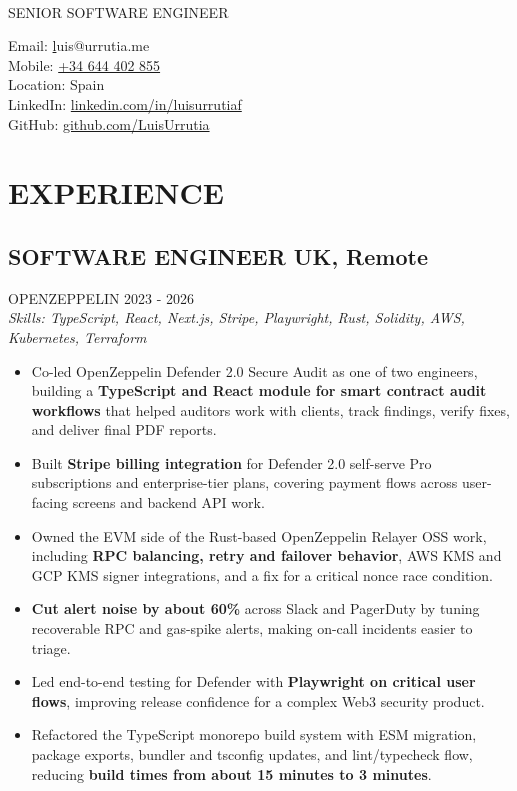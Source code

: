 \documentclass{article}
\newcommand{\WorkExperience}[2]{
   \subsection*{#1}
   \vspace{-1em}
   \uppercase{#2}
}
\newcommand{\Skills}[1]{
   \textit{Skills: #1}
}
\begin{document}
\begin{center}
	\begin{minipage}{0.5\textwidth}
		{\fontsize{24}{28}\Title{}} \\
		\bigskip
		{\normalsize \MakeUppercase{Senior Software Engineer}}
	\end{minipage} \hfill
	\begin{minipage}{0.4\textwidth}
		\raggedleft{}
		Email: \href{mailto:luis@urrutia.me}luis@urrutia.me \\
		Mobile: \href{tel:+34644402855}{+34 644 402 855}  \\
		Location: Spain \\
		LinkedIn: \href{https://linkedin.com/in/luisurrutiaf}{linkedin.com/in/luisurrutiaf} \\
		GitHub: \href{https://github.com/LuisUrrutia}{github.com/LuisUrrutia}
	\end{minipage}
\end{center}

\vspace{-3em}

\phantom{Amazon, Microsoft, Facebook} %

\section*{EXPERIENCE}
\WorkExperience{SOFTWARE ENGINEER \hfill UK, Remote}{OpenZeppelin \hfill 2023 {-} 2026} \\
\Skills{TypeScript, React, Next.js, Stripe, Playwright, Rust, Solidity, AWS, Kubernetes, Terraform}
\begin{itemize}
	\item Co-led OpenZeppelin Defender 2.0 Secure Audit as one of two engineers, building a \textbf{TypeScript and React module for smart contract audit workflows} that helped auditors work with clients, track findings, verify fixes, and deliver final PDF reports.
	\item Built \textbf{Stripe billing integration} for Defender 2.0 self-serve Pro subscriptions and enterprise-tier plans, covering payment flows across user-facing screens and backend API work.
	\item Owned the EVM side of the Rust-based OpenZeppelin Relayer OSS work, including \textbf{RPC balancing, retry and failover behavior}, AWS KMS and GCP KMS signer integrations, and a fix for a critical nonce race condition.
	\item \textbf{Cut alert noise by about 60\%} across Slack and PagerDuty by tuning recoverable RPC and gas-spike alerts, making on-call incidents easier to triage.
	\item Led end-to-end testing for Defender with \textbf{Playwright on critical user flows}, improving release confidence for a complex Web3 security product.
	\item Refactored the TypeScript monorepo build system with ESM migration, package exports, bundler and tsconfig updates, and lint/typecheck flow, reducing \textbf{build times from about 15 minutes to 3 minutes}.
\end{itemize}
\end{document}

